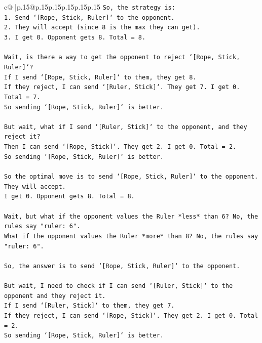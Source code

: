 \documentclass{article}
\begin{document}
{\begin{supertabular}{c@{$\;$}|p{.15\linewidth}@{}p{.15\linewidth}p{.15\linewidth}p{.15\linewidth}p{.15\linewidth}p{.15\linewidth}}
{{{\texttt{So, the strategy is:} \\
\texttt{1. Send `{[}Rope, Stick, Ruler{]}` to the opponent.} \\
\texttt{2. They will accept (since 8 is the max they can get).} \\
\texttt{3. I get 0. Opponent gets 8. Total = 8.} \\
\\ 
\texttt{Wait, is there a way to get the opponent to reject `{[}Rope, Stick, Ruler{]}`?} \\
\texttt{If I send `{[}Rope, Stick, Ruler{]}` to them, they get 8.} \\
\texttt{If they reject, I can send `{[}Ruler, Stick{]}`. They get 7. I get 0. Total = 7.} \\
\texttt{So sending `{[}Rope, Stick, Ruler{]}` is better.} \\
\\ 
\texttt{But wait, what if I send `{[}Ruler, Stick{]}` to the opponent, and they reject it?} \\
\texttt{Then I can send `{[}Rope, Stick{]}`. They get 2. I get 0. Total = 2.} \\
\texttt{So sending `{[}Rope, Stick, Ruler{]}` is better.} \\
\\ 
\texttt{So the optimal move is to send `{[}Rope, Stick, Ruler{]}` to the opponent.} \\
\texttt{They will accept.} \\
\texttt{I get 0. Opponent gets 8. Total = 8.} \\
\\ 
\texttt{Wait, but what if the opponent values the Ruler *less* than 6? No, the rules say "ruler: 6".} \\
\texttt{What if the opponent values the Ruler *more* than 8? No, the rules say "ruler: 6".} \\
\\ 
\texttt{So, the answer is to send `{[}Rope, Stick, Ruler{]}` to the opponent.} \\
\\ 
\texttt{But wait, I need to check if I can send `{[}Ruler, Stick{]}` to the opponent and they reject it.} \\
\texttt{If I send `{[}Ruler, Stick{]}` to them, they get 7.} \\
\texttt{If they reject, I can send `{[}Rope, Stick{]}`. They get 2. I get 0. Total = 2.} \\
\texttt{So sending `{[}Rope, Stick, Ruler{]}` is better.} \\
}}}
\end{supertabular}}
\end{document}
